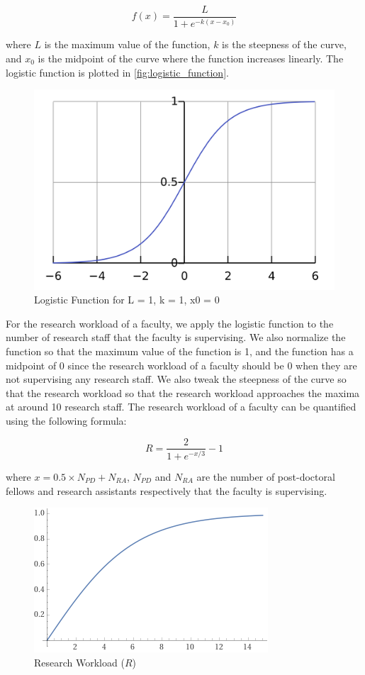 \begin{equation*}
      f(x) = \frac{L}{1 + e^{-k(x-x_0)}}
\end{equation*}

where $L$ is the maximum value of the function, $k$ is the steepness of the curve, and $x_0$ is the midpoint of the curve where the function increases linearly. The logistic function is plotted in \autoref{fig:logistic_function}.

\begin{figure}[htpb]
      \centering
      \includegraphics[width=0.5\linewidth]{images/tanh_plot.png}
      \caption{Logistic Function for L = 1, k = 1, x0 = 0}
      \label{fig:logistic_function}
\end{figure}

For the research workload of a faculty, we apply the logistic function to the number of research staff that the faculty is supervising. We also normalize the function so that the maximum value of the function is 1, and the function has a midpoint of 0 since the research workload of a faculty should be 0 when they are not supervising any research staff. We also tweak the steepness of the curve so that the research workload so that the research workload approaches the maxima at around 10 research staff. The research workload of a faculty can be quantified using the following formula:

\begin{equation}
      R = \frac{2}{1 + e^{-x/3}} - 1
\end{equation}

where $ x = 0.5 \times N_{PD} +  N_{RA}$, $N_{PD}$ and $N_{RA}$ are the number of post-doctoral fellows and research assistants respectively that the faculty is supervising.

\begin{figure}[htpb]
      \centering
      \includegraphics[width=0.5\linewidth]{images/research_workload_plot.png}
      \caption{Research Workload ($R$)}
      \label{fig:research_workload_plot}
\end{figure}


